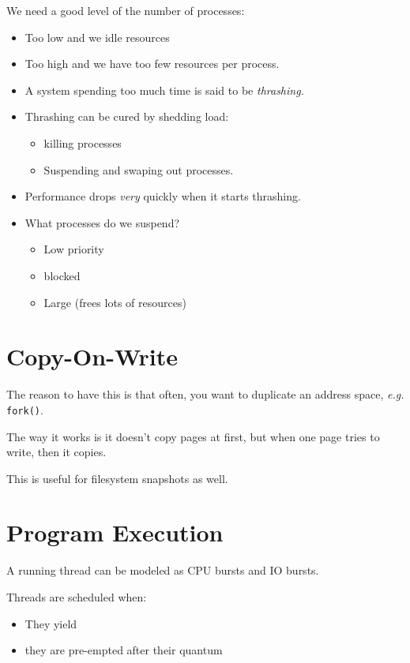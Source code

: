 \documentclass[12pt]{article}
\begin{document}
We need a good level of the number of processes:
\begin{itemize}
	\item Too low and we idle resources
	\item Too high and we have too few resources per process.
	\item A system spending too much time is said to be \emph{thrashing.}
	\item Thrashing can be cured by shedding load:
		\begin{itemize}
			\item killing processes
			\item Suspending and swaping out processes.
		\end{itemize}
	\item Performance drops \emph{very} quickly when it starts thrashing.
	\item What processes do we suspend?
		\begin{itemize}
			\item Low priority
			\item blocked
			\item Large (frees lots of resources)
		\end{itemize}
\end{itemize}

\section{Copy-On-Write}

The reason to have this is that often, you want to duplicate an address space,
\textit{e.g.} \texttt{fork()}.

The way it works is it doesn't copy pages at first, but when one page tries to
write, then it copies.

This is useful for filesystem snapshots as well.

\section{Program Execution}

A running thread can be modeled as CPU bursts and IO bursts.

Threads are scheduled when:
\begin{itemize}
	\item They yield
	\item they are pre-empted after their quantum
\end{itemize}
\end{document}
